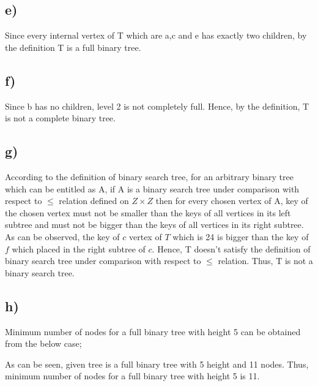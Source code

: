 \documentclass[11pt]{article}
\begin{document}
\subsection*{e)}
Since every internal vertex of T which are a,c and e has exactly two children, by the definition T is a full binary tree.
\subsection*{f)}
Since b has no children, level 2 is not completely full. Hence, by the definition, T is not a complete binary tree.
\subsection*{g)}
According to the definition of binary search tree, for an arbitrary binary tree which can be entitled as A, if A is a binary search tree under comparison with respect to $\leq$ relation defined on $Z \times Z$ then for every chosen vertex of A, key of the chosen vertex must not be smaller than the keys of all vertices in its left subtree and must not be bigger than the keys of all vertices in its right subtree. As can be observed, the key of $c$ vertex of $T$ which is 24 is bigger than the key of $f$ which placed in the right subtree of $c$. Hence, T doesn't satisfy the definition of binary search tree under comparison with respect to $\leq$ relation. Thus, T is not a binary search tree.
\subsection*{h)}
Minimum number of nodes for a full binary tree with height 5 can be obtained from the below case; \\
\begin{figure}[H]
	\centering
\end{figure}
As can be seen, given tree is a full binary tree with 5 height and 11 nodes. Thus, minimum number of nodes for a full binary tree with height 5 is 11.
\end{document}

